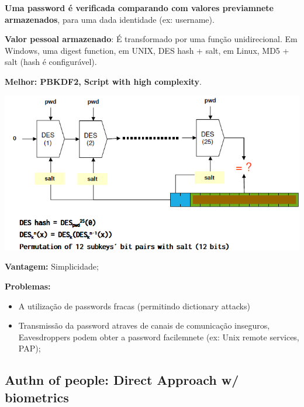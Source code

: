 \documentclass{article}
\begin{document}
\textbf{Uma password é verificada comparando com valores previamnete armazenados},
para uma dada identidade (ex: username).

\vspace{2mm}

\textbf{Valor pessoal armazenado}: É transformado por uma função unidirecional.
Em Windows, uma digest function, em UNIX, DES hash + salt, em Linux,
MD5 + salt (hash é configurável).

\vspace{3mm}

\textbf{Melhor: PBKDF2, Script with high complexity}.

\begin{center}
  \includegraphics[scale=0.55]{21}
\end{center}

\begin{flushleft}
  \textbf{Vantagem:} Simplicidade;

  \vspace{2mm}

  \textbf{Problemas:} 
  
  \begin{itemize}
    \item A utilização de passwords fracas (permitindo dictionary attacks)
    \item Transmissão da password atraves de canais de comunicação inseguros,
    Eavesdroppers podem obter a password facilemnete (ex: Unix remote services, PAP);
  \end{itemize}
\end{flushleft}

\pagebreak

\subsection{Authn of people: Direct Approach w/ biometrics}
\end{document}
